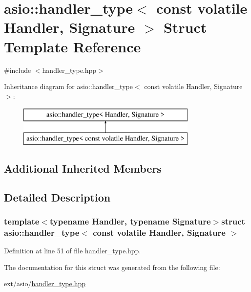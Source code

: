 \hypertarget{structasio_1_1handler__type_3_01const_01volatile_01_handler_00_01_signature_01_4}{}\section{asio\+:\+:handler\+\_\+type$<$ const volatile Handler, Signature $>$ Struct Template Reference}
\label{structasio_1_1handler__type_3_01const_01volatile_01_handler_00_01_signature_01_4}


{\ttfamily \#include $<$handler\+\_\+type.\+hpp$>$}

Inheritance diagram for asio\+:\+:handler\+\_\+type$<$ const volatile Handler, Signature $>$\+:\begin{figure}[H]
\begin{center}
\leavevmode
\includegraphics[height=2.000000cm]{structasio_1_1handler__type_3_01const_01volatile_01_handler_00_01_signature_01_4}
\end{center}
\end{figure}
\subsection*{Additional Inherited Members}


\subsection{Detailed Description}
\subsubsection*{template$<$typename Handler, typename Signature$>$struct asio\+::handler\+\_\+type$<$ const volatile Handler, Signature $>$}



Definition at line 51 of file handler\+\_\+type.\+hpp.



The documentation for this struct was generated from the following file\+:\begin{DoxyCompactItemize}
\item 
ext/asio/\hyperlink{handler__type_8hpp}{handler\+\_\+type.\+hpp}\end{DoxyCompactItemize}
